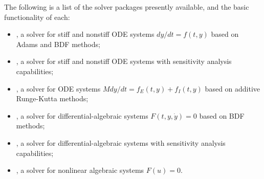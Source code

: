 The following is a list of the solver packages presently available, and
the basic functionality of each:
\begin{itemize}

\item {\cvode},  
  a solver for stiff and nonstiff ODE systems $dy/dt = f(t,y)$ based
  on Adams and BDF methods;

\item {\cvodes},
  a solver for stiff and nonstiff ODE systems with sensitivity analysis capabilities;

\item {\arkode},
  a solver for ODE systems $M dy/dt = f_E(t,y) + f_I(t,y)$ based on
  additive Runge-Kutta methods; 

\item {\ida},
  a solver for differential-algebraic systems $F(t,y,\dot{y}) = 0$ based on BDF methods;

\item {\idas},
  a solver for differential-algebraic systems
  with sensitivity analysis capabilities;

\item {\kinsol}, 
  a solver for nonlinear algebraic systems $F(u) = 0$.

\end{itemize}
